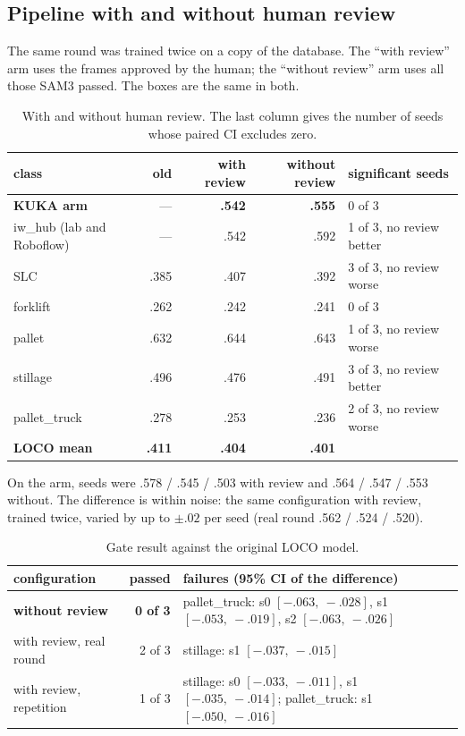 \documentclass[11pt,a4paper]{article}
\begin{document}
\subsection{Pipeline with and without human review}
\label{sec:review}

The same round was trained twice on a copy of the database. The ``with review''
arm uses the frames approved by the human; the ``without review'' arm uses all
those SAM3 passed. The boxes are the same in both.

\begin{table}[H]
\centering\small
\caption{With and without human review. The last column gives the number of seeds
whose paired CI excludes zero.}
\label{tab:review}
\begin{tabular}{lrrrl}
\toprule
class & old & with review & without review & significant seeds \\
\midrule
\textbf{KUKA arm} & --- & \textbf{.542} & \textbf{.555} & 0 of 3 \\
iw\_hub (lab and Roboflow) & --- & .542 & .592 & 1 of 3, no review better \\
SLC & .385 & .407 & .392 & 3 of 3, no review worse \\
forklift & .262 & .242 & .241 & 0 of 3 \\
pallet & .632 & .644 & .643 & 1 of 3, no review worse \\
stillage & .496 & .476 & .491 & 3 of 3, no review better \\
pallet\_truck & .278 & .253 & .236 & 2 of 3, no review worse \\
\textbf{LOCO mean} & \textbf{.411} & \textbf{.404} & \textbf{.401} & \\
\bottomrule
\end{tabular}
\end{table}

On the arm, seeds were .578 / .545 / .503 with review and .564 / .547 / .553
without. The difference is within noise: the same configuration with review,
trained twice, varied by up to $\pm.02$ per seed (real round .562 / .524 / .520).

\begin{table}[H]
\centering\small
\caption{Gate result against the original LOCO model.}
\label{tab:gate}
\begin{tabular}{lrp{8.4cm}}
\toprule
configuration & passed & failures (95\% CI of the difference) \\
\midrule
\textbf{without review} & \textbf{0 of 3} & pallet\_truck: s0 $[-.063,\ -.028]$, s1 $[-.053,\ -.019]$, s2 $[-.063,\ -.026]$ \\
with review, real round & 2 of 3 & stillage: s1 $[-.037,\ -.015]$ \\
with review, repetition & 1 of 3 & stillage: s0 $[-.033,\ -.011]$, s1 $[-.035,\ -.014]$; pallet\_truck: s1 $[-.050,\ -.016]$ \\
\bottomrule
\end{tabular}
\end{table}
\end{document}
